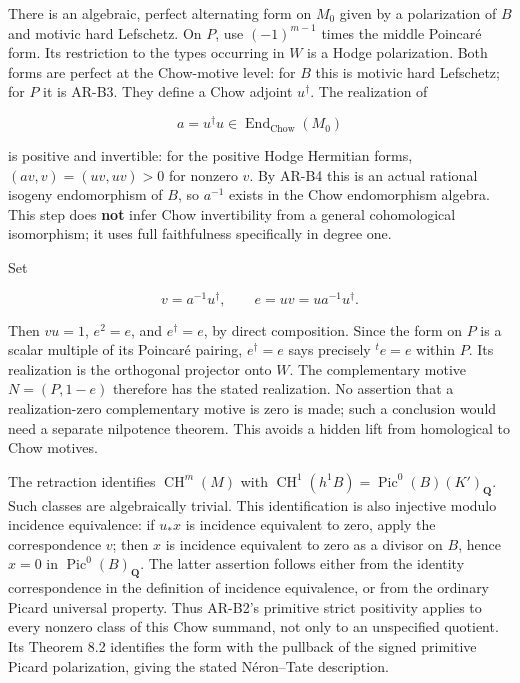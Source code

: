 \documentclass[11pt,a4paper]{article}
\begin{document}
There is an algebraic, perfect alternating form on \(M_0\) given by a
polarization of \(B\) and motivic hard Lefschetz. On \(P\), use
\((-1)^{m-1}\) times the middle Poincaré form. Its restriction to the
types occurring in \(W\) is a Hodge polarization. Both forms are perfect
at the Chow-motive level: for \(B\) this is motivic hard Lefschetz; for
\(P\) it is AR-B3. They define a Chow adjoint \(u^\dagger\). The
realization of

\[
a=u^\dagger u\in\operatorname{End}_{\mathrm{Chow}}(M_0)
\]

is positive and invertible: for the positive Hodge Hermitian forms,
\((av,v)=(uv,uv)>0\) for nonzero \(v\). By AR-B4 this is an actual
rational isogeny endomorphism of \(B\), so \(a^{-1}\) exists in the Chow
endomorphism algebra. This step does \textbf{not} infer Chow
invertibility from a general cohomological isomorphism; it uses full
faithfulness specifically in degree one.

Set

\[
v=a^{-1}u^\dagger,\qquad e=uv=u a^{-1}u^\dagger.
\]

Then \(vu=1\), \(e^2=e\), and \(e^\dagger=e\), by direct composition.
Since the form on \(P\) is a scalar multiple of its Poincaré pairing,
\(e^\dagger=e\) says precisely \({}^t e=e\) within \(P\). Its
realization is the orthogonal projector onto \(W\). The complementary
motive \(N=(P,1-e)\) therefore has the stated realization. No assertion
that a realization-zero complementary motive is zero is made; such a
conclusion would need a separate nilpotence theorem. This avoids a
hidden lift from homological to Chow motives.

The retraction identifies \(\operatorname{CH}^m(M)\) with
\(\operatorname{CH}^1(h^1B)=\operatorname{Pic}^0(B)(K')_{\mathbf Q}\).
Such classes are algebraically trivial. This identification is also
injective modulo incidence equivalence: if \(u_*x\) is incidence
equivalent to zero, apply the correspondence \(v\); then \(x\) is
incidence equivalent to zero as a divisor on \(B\), hence \(x=0\) in
\(\operatorname{Pic}^0(B)_{\mathbf Q}\). The latter assertion follows
either from the identity correspondence in the definition of incidence
equivalence, or from the ordinary Picard universal property. Thus
AR-B2's primitive strict positivity applies to every nonzero class of
this Chow summand, not only to an unspecified quotient. Its Theorem 8.2
identifies the form with the pullback of the signed primitive Picard
polarization, giving the stated Néron--Tate description.
\end{document}
